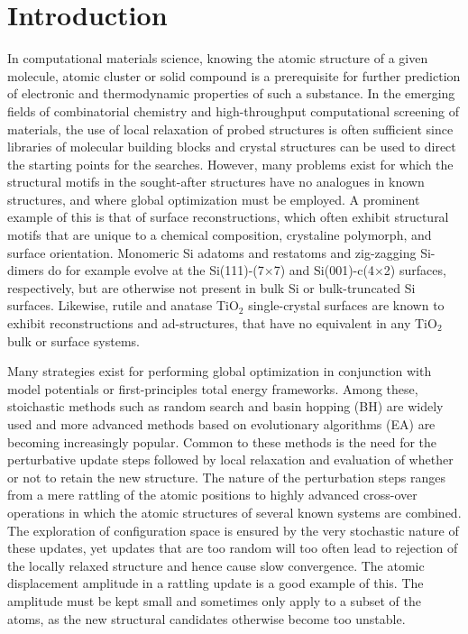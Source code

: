 \documentclass[aip,amsmath,amssymb,reprint]{revtex4-1}
\begin{document}
\section{\label{sec:introduction}Introduction}
In computational materials science, knowing the atomic structure of a
given molecule, atomic cluster or solid compound is a prerequisite for
further prediction of electronic and thermodynamic properties of such
a substance. In the emerging fields of combinatorial chemistry and
high-throughput computational screening of materials,\cite{curtarolo2013} the use of local
relaxation of probed structures is often sufficient since libraries of
molecular building blocks and crystal structures can be used to direct
the starting points for the searches.\cite{hafner2006} However, many problems exist for
which the structural motifs in the sought-after structures have no
analogues in known structures, and where global optimization must be
employed. A prominent example of this is that of surface reconstructions,
which often exhibit structural motifs that are unique to a chemical
composition, crystaline polymorph, and surface orientation. Monomeric
Si adatoms and restatoms and zig-zagging Si-dimers do for example evolve at the
Si(111)-(7$\times$7) and Si(001)-c(4$\times$2) surfaces,\cite{si7x7,si4x2} respectively, but
are otherwise not present in bulk Si or bulk-truncated Si surfaces. Likewise,
rutile and anatase TiO$_2$ single-crystal surfaces are known to exhibit
reconstructions and ad-structures,\cite{anatase1,anatase2,rutile1,rutile2} that have no equivalent in any TiO$_2$ bulk or surface systems.

Many strategies exist for performing global optimization in
conjunction with model potentials or first-principles total energy
frameworks. Among these, stoichastic methods such as random search\cite{pickard2011} and
basin hopping (BH)\cite{wales1997} are widely used and more advanced methods based on
evolutionary algorithms (EA) are becoming increasingly popular.\cite{johnston2003} Common
to these methods is the need for the perturbative update steps
followed by local relaxation and evaluation of whether or not to
retain the new structure. The nature of the perturbation steps ranges
from a mere rattling of the atomic positions to highly advanced
cross-over operations in which the atomic structures of several known
systems are combined.\cite{ho1995} The exploration of configuration space is
ensured by the very stochastic nature of these updates,\cite{mathias2018} yet updates
that are too random will too often lead to rejection of the locally
relaxed structure and hence cause slow convergence. The atomic
displacement amplitude in a rattling update is a good example of
this. The amplitude must be kept small and sometimes only apply to a
subset of the atoms, as the new structural candidates otherwise become
too unstable.
\end{document}
